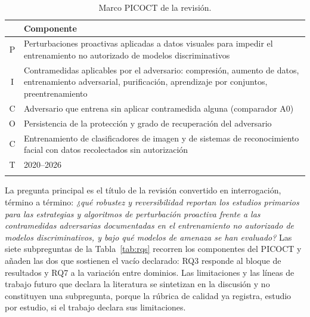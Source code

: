 \documentclass[pdflatex,sn-mathphys-num]{sn-jnl}
\theoremstyle{thmstyleone}
\theoremstyle{thmstyletwo}
\theoremstyle{thmstylethree}
\begin{document}
\begin{table}[h]
\centering
\caption{Marco PICOCT de la revisión.}\label{tab:picoct}
\begin{tabularx}{\textwidth}{@{}cX@{}}
\toprule
 & Componente \\
\midrule
P & Perturbaciones proactivas aplicadas a datos visuales para impedir el entrenamiento no autorizado de modelos discriminativos \\
I & Contramedidas aplicables por el adversario: compresión, aumento de datos, entrenamiento adversarial, purificación, aprendizaje por conjuntos, preentrenamiento \\
C & Adversario que entrena sin aplicar contramedida alguna (comparador A0) \\
O & Persistencia de la protección y grado de recuperación del adversario \\
C & Entrenamiento de clasificadores de imagen y de sistemas de reconocimiento facial con datos recolectados sin autorización \\
T & 2020--2026 \\
\botrule
\end{tabularx}
\end{table}

La pregunta principal es el título de la revisión convertido en interrogación, término a término: \emph{¿qué robustez y reversibilidad reportan los estudios primarios para las estrategias y algoritmos de perturbación proactiva frente a las contramedidas adversarias documentadas en el entrenamiento no autorizado de modelos discriminativos, y bajo qué modelos de amenaza se han evaluado?} Las siete subpreguntas de la Tabla~\ref{tab:rqs} recorren los componentes del PICOCT y añaden las dos que sostienen el vacío declarado: RQ3 responde al bloque de resultados y RQ7 a la variación entre dominios. Las limitaciones y las líneas de trabajo futuro que declara la literatura se sintetizan en la discusión y no constituyen una subpregunta, porque la rúbrica de calidad ya registra, estudio por estudio, si el trabajo declara sus limitaciones.
\end{document}
